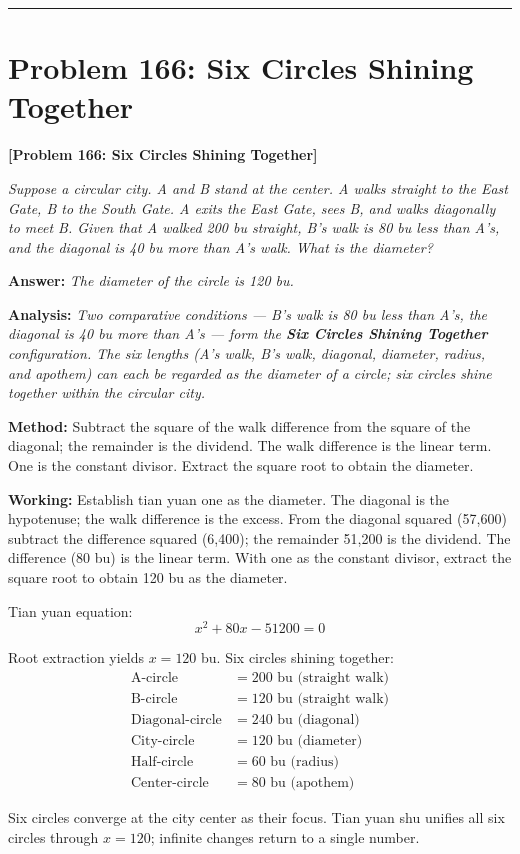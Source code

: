 \documentclass[11pt,a4paper]{book}
\newcommand{\answer}[1]{\noindent\textbf{\color{anacolor}Answer: }\textit{#1}\par}
\newcommand{\method}[1]{\noindent\textbf{\color{methodcolor}Method: }#1\par}
\newcommand{\working}[1]{\noindent\textbf{\color{workcolor}Working: }#1\par}
\newcommand{\analysis}[1]{\noindent\textbf{\color{anacolor}Analysis: }\textit{#1}\par}
\newcommand{\shortline}{\noindent\rule{0.5\textwidth}{0.4pt}\par}
\begin{document}
\shortline

\section{Problem 166: Six Circles Shining Together}
\label{sec:prob166}

\noindent\textbf{\color{probcolor}[Problem 166: Six Circles Shining Together]}

\textit{Suppose a circular city. A and B stand at the center. A walks straight to the East Gate, B to the South Gate. A exits the East Gate, sees B, and walks diagonally to meet B. Given that A walked 200 bu straight, B's walk is 80 bu less than A's, and the diagonal is 40 bu more than A's walk. What is the diameter?}

\answer{The diameter of the circle is 120 bu.}

\analysis{Two comparative conditions --- B's walk is 80 bu less than A's, the diagonal is 40 bu more than A's --- form the \textbf{Six Circles Shining Together} configuration. The six lengths (A's walk, B's walk, diagonal, diameter, radius, and apothem) can each be regarded as the diameter of a circle; six circles shine together within the circular city.}

\method{Subtract the square of the walk difference from the square of the diagonal; the remainder is the dividend. The walk difference is the linear term. One is the constant divisor. Extract the square root to obtain the diameter.}

\working{Establish tian yuan one as the diameter. The diagonal is the hypotenuse; the walk difference is the excess. From the diagonal squared (57,600) subtract the difference squared (6,400); the remainder 51,200 is the dividend. The difference (80 bu) is the linear term. With one as the constant divisor, extract the square root to obtain 120 bu as the diameter.

Tian yuan equation:
$$x^2 + 80x - 51200 = 0$$

Root extraction yields $x = 120$ bu. Six circles shining together:
\begin{align*}
\text{A-circle} &= 200 \text{ bu (straight walk)} \\
\text{B-circle} &= 120 \text{ bu (straight walk)} \\
\text{Diagonal-circle} &= 240 \text{ bu (diagonal)} \\
\text{City-circle} &= 120 \text{ bu (diameter)} \\
\text{Half-circle} &= 60 \text{ bu (radius)} \\
\text{Center-circle} &= 80 \text{ bu (apothem)}
\end{align*}

Six circles converge at the city center as their focus. Tian yuan shu unifies all six circles through $x = 120$; infinite changes return to a single number.}
\end{document}
